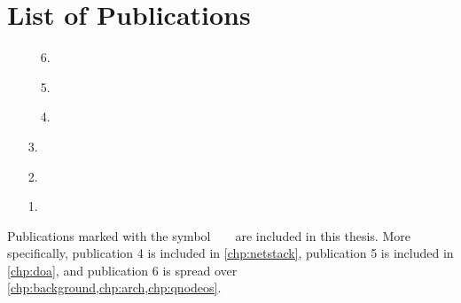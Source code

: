 \chapter*{List of Publications}

\def\ticon{{\footnotesize \faFileTextO}}

\begin{enumerate}[label={\ticon~~\arabic*.},itemsep=\baselineskip]
    \item[\ticon~~6.] 
    \item[\ticon~~5.] 
    \item[\ticon~~4.] 
    \item[3.] 
    \item[2.] 
    \item[1.] 
\end{enumerate}

\vspace{2\baselineskip}
\noindent
Publications marked with the symbol~~\ticon~~are included in this thesis. More specifically,
publication 4 is included in \cref{chp:netstack}, publication 5 is included in \cref{chp:doa}, and
publication 6 is spread over \cref{chp:background,chp:arch,chp:qnodeos}.

\begin{xstretch}
\printbibliography[heading=subbibintoc,title={References},notcategory=noprint]
\end{xstretch}
